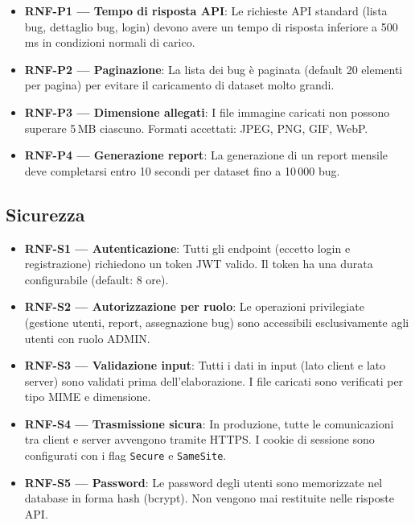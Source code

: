 \begin{itemize}
    \item \textbf{RNF-P1 --- Tempo di risposta API}: Le richieste API standard (lista bug, dettaglio bug, login) devono avere un tempo di risposta inferiore a 500\,ms in condizioni normali di carico.
    \item \textbf{RNF-P2 --- Paginazione}: La lista dei bug è paginata (default 20 elementi per pagina) per evitare il caricamento di dataset molto grandi.
    \item \textbf{RNF-P3 --- Dimensione allegati}: I file immagine caricati non possono superare 5\,MB ciascuno. Formati accettati: JPEG, PNG, GIF, WebP.
    \item \textbf{RNF-P4 --- Generazione report}: La generazione di un report mensile deve completarsi entro 10 secondi per dataset fino a 10\,000 bug.
\end{itemize}

\subsection{Sicurezza}

\begin{itemize}
    \item \textbf{RNF-S1 --- Autenticazione}: Tutti gli endpoint (eccetto login e registrazione) richiedono un token JWT valido. Il token ha una durata configurabile (default: 8 ore).
    \item \textbf{RNF-S2 --- Autorizzazione per ruolo}: Le operazioni privilegiate (gestione utenti, report, assegnazione bug) sono accessibili esclusivamente agli utenti con ruolo ADMIN.
    \item \textbf{RNF-S3 --- Validazione input}: Tutti i dati in input (lato client e lato server) sono validati prima dell'elaborazione. I file caricati sono verificati per tipo MIME e dimensione.
    \item \textbf{RNF-S4 --- Trasmissione sicura}: In produzione, tutte le comunicazioni tra client e server avvengono tramite HTTPS. I cookie di sessione sono configurati con i flag \texttt{Secure} e \texttt{SameSite}.
    \item \textbf{RNF-S5 --- Password}: Le password degli utenti sono memorizzate nel database in forma hash (bcrypt). Non vengono mai restituite nelle risposte API.
\end{itemize}


